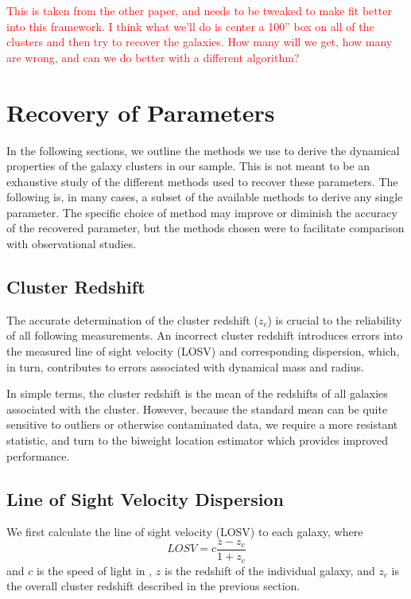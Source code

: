 \documentclass[apj, revtex4]{emulateapj}
\newcommand{\editorial}[1]{\textcolor{red}{#1}}
\begin{document}
\editorial{This is taken from the other paper, and needs to be tweaked to make fit better into this framework. I think what we'll do is center a 100'' box on all of the clusters and then try to recover the galaxies. How many will we get, how many are wrong, and can we do better with a different algorithm?}

\section{Recovery of Parameters}
 In the following sections, we outline the methods we use to derive the dynamical properties of the galaxy clusters in our sample. This is not meant to be an exhaustive study of the different methods used to recover these parameters. The following is, in many cases, a subset of the available methods to derive any single parameter. The specific choice of method may improve or diminish the accuracy of the recovered parameter, but the methods chosen were to facilitate comparison with observational studies.  

\subsection{Cluster Redshift}
The accurate determination of the cluster redshift ($z_c$) is crucial to the reliability of all following measurements. An incorrect cluster redshift introduces errors into the measured line of sight velocity (LOSV) and corresponding dispersion, which, in turn, contributes to errors associated with dynamical mass and radius. 

In simple terms, the cluster redshift is the  mean of the redshifts of all galaxies associated with the cluster. However, because the standard mean can be quite sensitive to outliers or otherwise contaminated data, we require a more resistant statistic, and turn to the biweight location estimator \citep{Beers1990} which provides improved performance. 

\subsection{Line of Sight Velocity Dispersion}\label{sec:LOSVD}
We first calculate the line of sight velocity (LOSV) to each galaxy, where
\begin{equation}
	LOSV = c\frac{z - z_c}{1+z_c}
\end{equation}
and $c$ is the speed of light in \kms, $z$ is the redshift of the individual galaxy, and $z_c$ is the overall cluster redshift described in the previous section.
\end{document}
